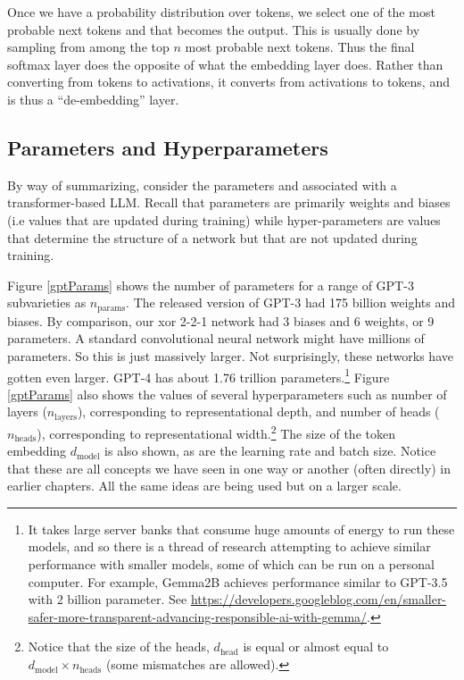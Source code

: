 Once we have a probability distribution over tokens, we select one of the most
probable next tokens and that becomes the output. This is usually done by
sampling from among the top $n$ most probable next tokens. Thus the final
softmax layer does the opposite of what the embedding layer does. Rather than
converting from tokens to activations, it converts from activations to tokens,
and is thus a ``de-embedding'' layer.

\subsection{Parameters and Hyperparameters}

By way of summarizing, consider the parameters and  
associated with a transformer-based LLM. Recall that parameters are primarily
weights and biases (i.e values that are updated during training) while
hyper-parameters are values that determine the structure of a network but that
are not updated during training.

Figure \ref{gptParams} shows the  number of parameters for a range of GPT-3
subvarieties as $n_\text{params}$. The released version of GPT-3 had 175
billion weights and biases. By comparison, our xor 2-2-1 network had 3 biases
and 6 weights, or 9 parameters. A standard convolutional neural network might
have millions of parameters. So this is just massively larger. Not
surprisingly, these networks have gotten even larger. GPT-4 has about 1.76
trillion parameters.\footnote{It takes large server banks that  consume huge
amounts of energy to run these models, and so there is a thread of research
attempting to achieve similar performance with smaller models, some of which
can be run on a  personal computer. For example, Gemma2B achieves performance
similar to GPT-3.5 with 2 billion parameter. See
\url{https://developers.googleblog.com/en/smaller-safer-more-transparent-advancing-responsible-ai-with-gemma/}.}
Figure \ref{gptParams} also shows the values of several hyperparameters such as
number of layers ($n_\text{layers}$), corresponding to representational depth,
and number of heads ($n_\text{heads}$), corresponding to representational
width.\footnote{Notice that the size of the heads, $d_\text{head}$ is equal or
almost equal to  $d_\text{model} \times n_\text{heads}$ (some mismatches are
allowed).} The size of the token embedding  $d_\text{model}$ is also shown, as
are the learning rate and batch size. Notice that these are all concepts we
have seen in one way or another (often directly) in earlier chapters. All the
same ideas are being used but on a larger scale.

